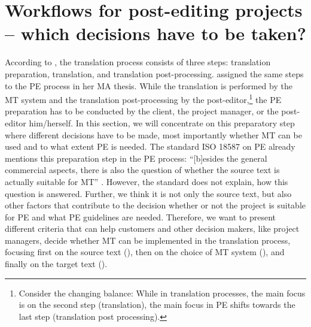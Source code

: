\chapter{Workflows for post-editing projects -- which decisions have to be taken?}\label{sec:8}


\vspace{\baselineskip}

According to \citet{hofmann2012prozessgestutztes}, the translation process consists of three steps: translation preparation, translation, and translation post-processing. \citet{hor_chancen_2020} assigned the same steps to the PE process in her MA thesis. While the translation is performed by the MT system and the translation post-processing by the post-editor,\footnote{Consider the changing balance: While in translation processes, the main focus is on the second step (translation), the main focus in PE shifts towards the last step (translation post processing).} the PE preparation has to be conducted by the client, the project manager, or the post-editor him/herself. In this section, we will concentrate on this preparatory step where different decisions have to be made, most importantly whether MT can be used and to what extent PE is needed. The standard ISO 18587 on PE already mentions this preparation step in the PE process: “[b]esides the general commercial aspects, there is also the question of whether the source text is actually suitable for MT” \citep[150]{wallberg_iso_2017}. However, the standard does not explain, how this question is answered. Further, we think it is not only the source text, but also other factors that contribute to the decision whether or not the project is suitable for PE and what PE guidelines are needed. Therefore, we want to present different criteria that can help customers and other decision makers, like project managers, decide whether MT can be implemented in the translation process, focusing first on the source text (), then on the choice of MT system (), and finally on the target text (). 

